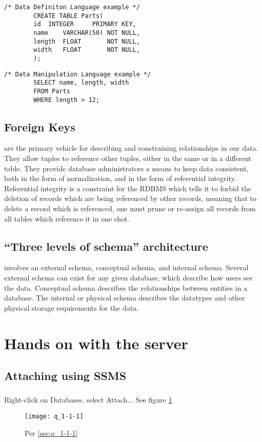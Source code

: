 \documentclass{article}
\begin{document}
		\begin{lstlisting}[float]
		/* Data Definiton Language example */
		CREATE TABLE Parts(
		id	INTEGER     PRIMARY KEY,
		name	VARCHAR(50) NOT NULL,
		length	FLOAT       NOT NULL,
		width	FLOAT       NOT NULL,
		);
		\end{lstlisting}

		\begin{lstlisting}[float]
		/* Data Manipulation Language example */
		SELECT name, length, width
		FROM Parts
		WHERE length > 12;
		\end{lstlisting}

	\subsection{Foreign Keys} are the primary vehicle for describing and
	constraining relationships in our data. They allow tuples to reference
	other tuples, either in the same or in a different table. They provide
	database administrators a means to keep data consistent, both in the
	form of normalization, and in the form of referential integrity.
	Referential integrity is a constraint for the RDBMS which tells it to
	forbid the deletion of records which are being referenced by other
	records, meaning that to delete a record which is referenced, one must
	prune or re-assign all records from all tables which reference it in
	one shot.

	\subsection{``Three levels of schema'' architecture} involves an
	external schema, conceptual schema, and internal schema. Several
	external schema can exist for any given database, which describe how
	users see the data. Conceptual schema describes the relationships
	between entities in a database. The internal or physical schema describes the
	datatypes and other physical storage requirements for the data.

\section{Hands on with the server}

\subsection{Attaching using SSMS}
\subsubsection{} Right-click on Databases, select Attach... \label{sec:q_1-1-1}
See figure \ref{fig:q_1-1-1}
\begin{figure}[H]\centering
	\caption{Per \ref{sec:q_1-1-1}}
	\texttt{[image: q\_1-1-1]}
	\label{fig:q_1-1-1}
\end{figure}
\end{document}
